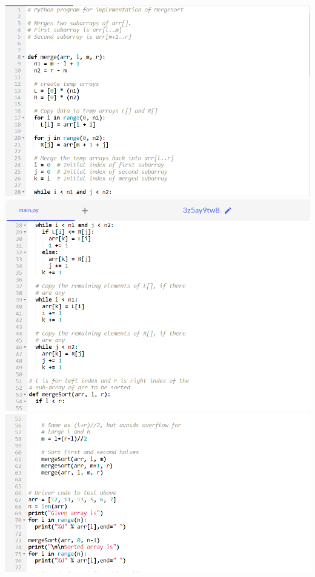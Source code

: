 \documentclass[12pt, letterpaper]{article}
\begin{document}
\begin{enumerate}
  \includegraphics[scale = 0.5]{sort1.PNG}\\
  \includegraphics[scale = 0.5]{sort2.PNG}\\
  \includegraphics[scale = 0.5]{sort3.PNG}


\end{enumerate}
\end{document}
